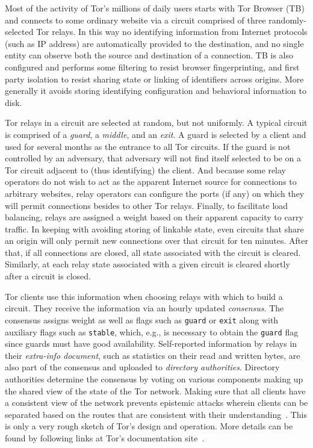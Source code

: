 Most of the activity of Tor's millions of daily users starts with Tor Browser
(TB) and connects to some ordinary website via a circuit comprised of three
randomly-selected Tor relays. In this way no identifying information from
Internet protocols (such as IP address) are automatically provided to the
destination, and no single entity can observe both the source and destination of
a connection. TB is also configured and performs some filtering to resist
browser fingerprinting, and first party isolation to resist sharing state or
linking of identifiers across origins. More generally it avoids storing
identifying configuration and behavioral information to disk.

Tor relays in a circuit are selected at random, but not uniformly. A typical
circuit is comprised of a \emph{guard}, a \emph{middle}, and an \emph{exit}. A
guard is selected by a client and used for several months as the entrance to all
Tor circuits. If the guard is not controlled by an adversary, that adversary
will not find itself selected to be on a Tor circuit adjacent to (thus
identifying) the client. And because some relay operators do not wish to act as
the apparent Internet source for connections to arbitrary websites, relay
operators can configure the ports (if any) on which they will permit connections
besides to other Tor relays. Finally, to facilitate load balancing, relays are
assigned a weight based on their apparent capacity to carry traffic. In keeping
with avoiding storing of linkable state, even circuits that share an origin will
only permit new connections over that circuit for ten minutes. After that, if
all connections are closed, all state associated with the circuit is cleared.
Similarly, at each relay state associated with a given circuit is cleared
shortly after a circuit is closed.

Tor clients use this information when choosing relays with which to build a
circuit. They receive the information via an hourly updated \emph{consensus}.
The consensus assigns weight as well as flags such as \texttt{guard} or
\texttt{exit} along with auxiliary flags such as \texttt{stable}, which, e.g.,
is necessary to obtain the \texttt{guard} flag since guards must have good
availability. Self-reported information by relays in their \emph{extra-info
document}, such as statistics on their read and written bytes, are also part of
the consensus and uploaded to \emph{directory authorities}. Directory
authorities determine the consensus by voting on various components making up
the shared view of the state of the Tor network. Making sure that all clients
have a consistent view of the network prevents epistemic attacks wherein clients
can be separated based on the routes that are consistent with their
understanding~\cite{danezis:pets2008}. This is only a very rough sketch of Tor's
design and operation.  More details can be found by following links at Tor's
documentation site~\cite{tor-documentation}.

